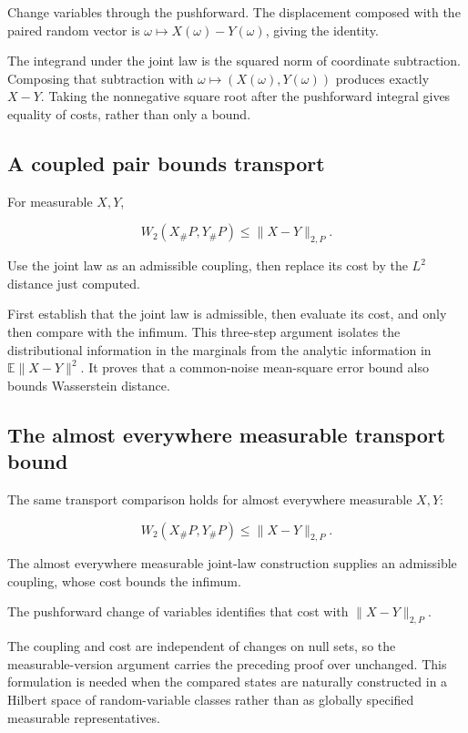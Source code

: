 \documentclass[11pt,a4paper]{article}
\begin{document}
Change variables through the pushforward. The displacement composed with the paired random vector is \(\omega\mapsto X(\omega)-Y(\omega)\), giving the identity.



The integrand under the joint law is the squared norm of coordinate subtraction. Composing that subtraction with \(\omega\mapsto(X(\omega),Y(\omega))\) produces exactly \(X-Y\). Taking the nonnegative square root after the pushforward integral gives equality of costs, rather than only a bound.


\subsection{\texorpdfstring{A coupled pair bounds transport}{A coupled pair bounds transport}}


For measurable \(X,Y\),

\[W_2(X_\#P,Y_\#P)\le\|X-Y\|_{2,P}.\]

Use the joint law as an admissible coupling, then replace its cost by the \(L^2\) distance just computed.



First establish that the joint law is admissible, then evaluate its cost, and only then compare with the infimum. This three-step argument isolates the distributional information in the marginals from the analytic information in \(\mathbb E\|X-Y\|^2\). It proves that a common-noise mean-square error bound also bounds Wasserstein distance.


\subsection{\texorpdfstring{The almost everywhere measurable transport bound}{The almost everywhere measurable transport bound}}


The same transport comparison holds for almost everywhere measurable \(X,Y\):

\[W_2(X_\#P,Y_\#P)\le\|X-Y\|_{2,P}.\]

The almost everywhere measurable joint-law construction supplies an admissible coupling, whose cost bounds the infimum.



The pushforward change of variables identifies that cost with \(\|X-Y\|_{2,P}\).



The coupling and cost are independent of changes on null sets, so the measurable-version argument carries the preceding proof over unchanged. This formulation is needed when the compared states are naturally constructed in a Hilbert space of random-variable classes rather than as globally specified measurable representatives.
\end{document}
